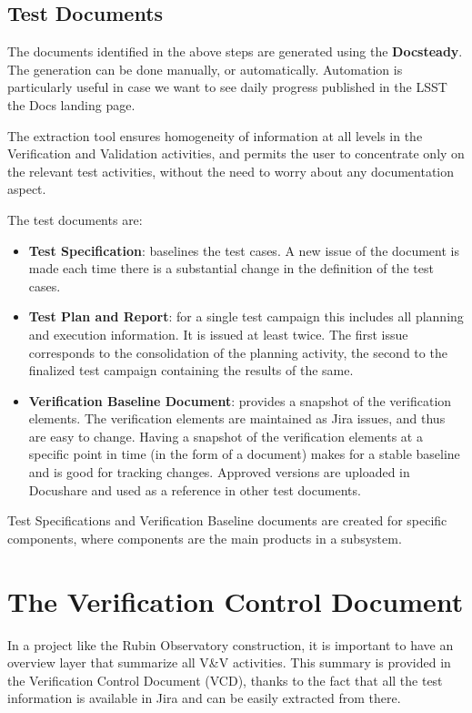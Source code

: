 \subsection{Test Documents}

The documents identified in the above steps are generated using the \textbf{Docsteady}.
The generation can be done manually, or automatically.
Automation is particularly useful in case we want to see daily progress published in the LSST the Docs landing page.

The extraction tool ensures homogeneity of information at all levels in the Verification and Validation activities,
and permits the user to concentrate only on the relevant test activities, without the need to worry about any documentation aspect.

The test documents are:

\begin{itemize}
\item \textbf{Test Specification}:  baselines the test cases.
A new issue of the document is made each time there is a substantial change in the definition of the test cases.
\item \textbf{Test Plan and Report}:  for a single test campaign this includes all planning and execution information.
It  is issued at least twice. The first issue corresponds to the consolidation of the planning activity,
the second to the finalized test campaign containing the results of the same.
\item \textbf{Verification Baseline Document}: provides a snapshot of the verification elements.
The verification elements are  maintained as Jira issues, and  thus are easy to change.
Having a snapshot of the verification elements at a specific point in time  (in the form of a document) makes
for a stable baseline and is good for tracking changes.
Approved versions are uploaded in Docushare and used as a reference in other test documents.
\end{itemize}

Test Specifications and Verification Baseline documents are created for specific components, where components are the main products in a subsystem.


\section{The Verification Control Document}

In a project like the Rubin Observatory construction,
it is important to have an overview layer that summarize all V\&V activities.
This summary is provided in the Verification Control Document (VCD), 
thanks to the fact that all the test information is available in Jira and can be easily extracted from there.

